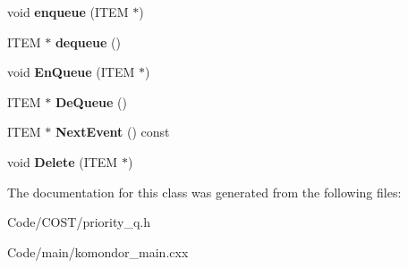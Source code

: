 \begin{DoxyCompactItemize}
void {\bfseries enqueue} (I\+T\+EM $\ast$)
\item 
\mbox{\label{classCalendarQueue_a2e2fcb27152564166279393962f4d82c}} 
I\+T\+EM $\ast$ {\bfseries dequeue} ()
\item 
\mbox{\label{classCalendarQueue_af0e8175c51f8c76b6a8d84a41d193ba1}} 
void {\bfseries En\+Queue} (I\+T\+EM $\ast$)
\item 
\mbox{\label{classCalendarQueue_ae2fb29435995672d46036b27dfd6d9a8}} 
I\+T\+EM $\ast$ {\bfseries De\+Queue} ()
\item 
\mbox{\label{classCalendarQueue_aa55882407726551d58d0759c57097acb}} 
I\+T\+EM $\ast$ {\bfseries Next\+Event} () const
\item 
\mbox{\label{classCalendarQueue_a88f7fc7197f7bdeac46bd48f14ec1623}} 
void {\bfseries Delete} (I\+T\+EM $\ast$)
\end{DoxyCompactItemize}


The documentation for this class was generated from the following files\+:\begin{DoxyCompactItemize}
\item 
Code/\+C\+O\+S\+T/priority\+\_\+q.\+h\item 
Code/main/komondor\+\_\+main.\+cxx\end{DoxyCompactItemize}
